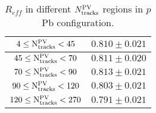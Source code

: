 \begin{table}[H]
\centering
\caption{$R_{eff}$ in different $N_{\rm tracks}^{\rm PV}$ regions in $p$Pb configuration.}
\begin{center}
\begin{tabular}{c|c}
\hline
$4 \leq \mathrm{N_{\rm tracks}^{\rm PV}} < 45$ & $0.810 \pm 0.021$ \\
\hline
$45 \leq \mathrm{N_{\rm tracks}^{\rm PV}} < 70$ & $0.811 \pm 0.020$ \\
\hline
$70 \leq \mathrm{N_{\rm tracks}^{\rm PV}} < 90$ & $0.813 \pm 0.021$ \\
\hline
$90 \leq \mathrm{N_{\rm tracks}^{\rm PV}} < 120$ & $0.803 \pm 0.021$ \\
\hline
$120 \leq \mathrm{N_{\rm tracks}^{\rm PV}} < 270$ & $0.791 \pm 0.021$ \\
\hline
\end{tabular}
\end{center}
\label{ReffTable_PVN_pPb}
\end{table}
